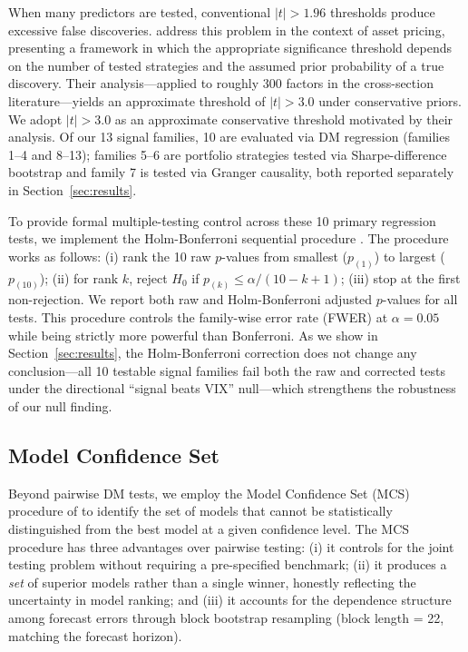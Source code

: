 \documentclass[12pt,a4paper]{article}
\begin{document}
When many predictors are tested, conventional $|t| > 1.96$ thresholds produce excessive false discoveries. \citet{harvey2016} address this problem in the context of asset pricing, presenting a framework in which the appropriate significance threshold depends on the number of tested strategies and the assumed prior probability of a true discovery. Their analysis---applied to roughly 300 factors in the cross-section literature---yields an approximate threshold of $|t| > 3.0$ under conservative priors. We adopt $|t| > 3.0$ as an approximate conservative threshold motivated by their analysis. Of our 13 signal families, 10 are evaluated via DM regression (families 1--4 and 8--13); families 5--6 are portfolio strategies tested via Sharpe-difference bootstrap and family 7 is tested via Granger causality, both reported separately in Section~\ref{sec:results}.

To provide formal multiple-testing control across these 10 primary regression tests, we implement the Holm-Bonferroni sequential procedure \citep{holm1979}. The procedure works as follows: (i) rank the 10 raw $p$-values from smallest ($p_{(1)}$) to largest ($p_{(10)}$); (ii) for rank $k$, reject $H_0$ if $p_{(k)} \leq \alpha / (10 - k + 1)$; (iii) stop at the first non-rejection. We report both raw and Holm-Bonferroni adjusted $p$-values for all tests. This procedure controls the family-wise error rate (FWER) at $\alpha = 0.05$ while being strictly more powerful than Bonferroni. As we show in Section~\ref{sec:results}, the Holm-Bonferroni correction does not change any conclusion---all 10 testable signal families fail both the raw and corrected tests under the directional ``signal beats VIX'' null---which strengthens the robustness of our null finding.

\subsection{Model Confidence Set}
\label{sec:mcs}

Beyond pairwise DM tests, we employ the Model Confidence Set (MCS) procedure of \citet{hansen2011mcs} to identify the set of models that cannot be statistically distinguished from the best model at a given confidence level. The MCS procedure has three advantages over pairwise testing: (i) it controls for the joint testing problem without requiring a pre-specified benchmark; (ii) it produces a \emph{set} of superior models rather than a single winner, honestly reflecting the uncertainty in model ranking; and (iii) it accounts for the dependence structure among forecast errors through block bootstrap resampling (block length = 22, matching the forecast horizon).
\end{document}

